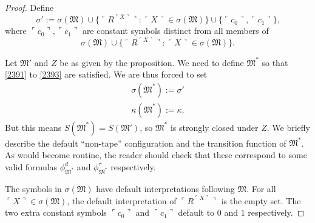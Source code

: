 \documentclass[12pt]{article}
\numberwithin{equation}{section}
\begin{document}
\begin{proof}
Define 
\begin{equation*}
    \sigma' := \sigma(\mathfrak{M}) \cup \{\ulcorner R^{\ulcorner X \urcorner} \urcorner : \ulcorner X \urcorner \in \sigma(\mathfrak{M})\} \cup \{\ulcorner c_0 \urcorner, \ulcorner c_1 \urcorner\} \text{,}
\end{equation*}
where $\ulcorner c_0 \urcorner, \ulcorner c_1 \urcorner$ are constant symbols distinct from all members of
\begin{equation*}
    \sigma(\mathfrak{M}) \cup \{\ulcorner R^{\ulcorner X \urcorner} \urcorner : \ulcorner X \urcorner \in \sigma(\mathfrak{M})\} \text{.}
\end{equation*}

Let $\mathfrak{M}'$ and $Z$ be as given by the proposition. We need to define $\mathfrak{M}^*$ so that \ref{2391} to \ref{2393} are satisfied. We are thus forced to set 
\begin{gather*}
    \sigma(\mathfrak{M}^*) := \sigma' \\
    \kappa(\mathfrak{M}^*) := \kappa \text{.}
\end{gather*}
But this means $S(\mathfrak{M}^*) = S(\mathfrak{M}')$, so $\mathfrak{M}^*$ is strongly closed under $Z$. We briefly describe the default ``non-tape'' configuration and the transition function of $\mathfrak{M}^*$. As would become routine, the reader should check that these correspond to some valid formulas $\phi^d_{\mathfrak{M^*}}$ and $\phi^{\tau}_{\mathfrak{M^*}}$ respectively.

The symbols in $\sigma(\mathfrak{M})$ have default interpretations following $\mathfrak{M}$. For all $\ulcorner X \urcorner \in \sigma(\mathfrak{M})$, the default interpretation of $\ulcorner R^{\ulcorner X \urcorner} \urcorner$ is the empty set. The two extra constant symbols $\ulcorner c_0 \urcorner$ and $\ulcorner c_1 \urcorner$ default to $0$ and $1$ respectively. 


\end{proof}
\end{document}
